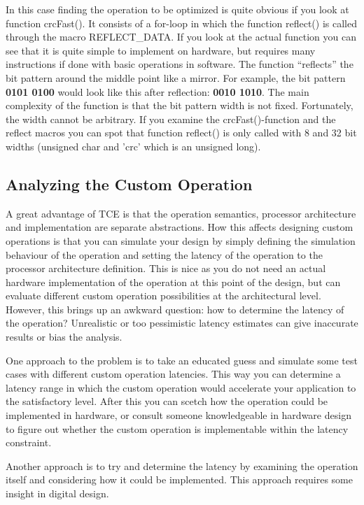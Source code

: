 \documentclass[twoside]{tceusermanual}
\begin{document}
In this case finding the operation to be optimized is quite obvious if you
look at function crcFast(). It consists of a for-loop in which the 
function reflect() is called through the macro REFLECT\_DATA. If you look at 
the actual function you can see that it is quite simple to implement on 
hardware, but requires many instructions if done with basic operations in
software. The function ``reflects'' the bit pattern around the middle point like
a mirror. For example,
the bit pattern \textbf{0101 0100} would look like this after reflection:
\textbf{0010 1010}. The main complexity of the function is that the bit pattern width is not
fixed. Fortunately, the width cannot be arbitrary. If you examine the
crcFast()-function and the reflect macros you can spot that function reflect() is
only called with 8 and 32 bit widths (unsigned char and 'crc' which is an unsigned long).

\subsection{Analyzing the Custom Operation}

A great advantage of TCE is that the operation semantics, 
processor architecture and implementation are separate abstractions. 
How this affects designing custom operations is that you can
simulate your design by simply defining the simulation behaviour of 
the operation and setting the latency of the operation to the processor
architecture definition. This is nice as you
do not need an actual hardware implementation of the operation at this point
of the design, but
can evaluate different custom operation possibilities at the architectural
level. However, this brings up an awkward question: how to determine 
the latency of the operation? Unrealistic or too pessimistic 
latency estimates can give inaccurate results or bias the analysis.

One approach to the problem is to take an educated guess and simulate
some test cases with different custom operation latencies. This way you can
determine a latency range in which the custom operation would accelerate your
application to the satisfactory level. After this you can scetch how the
operation could be implemented in hardware, or consult someone knowledgeable 
in hardware design to figure out whether the custom operation is 
implementable within the latency constraint.

Another approach is to try and determine the latency by examining the
operation itself and considering how it could be implemented. This approach
requires some insight in digital design.
\end{document}
